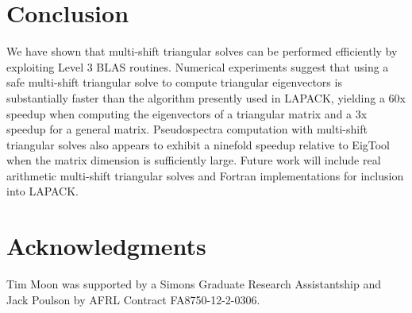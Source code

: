 \documentclass{article}
\begin{document}
\section{Conclusion}
We have shown that multi-shift triangular solves can be performed
efficiently by exploiting Level 3 BLAS routines. Numerical experiments
suggest that using a safe multi-shift triangular solve to compute
triangular eigenvectors is substantially faster than the algorithm
presently used in LAPACK, yielding a 60x speedup when computing the
eigenvectors of a triangular matrix and a 3x speedup for a general
matrix. Pseudospectra computation with multi-shift triangular solves
also appears to exhibit a ninefold speedup relative to EigTool when
the matrix dimension is sufficiently large.  Future work will include
real arithmetic multi-shift triangular solves and Fortran
implementations for inclusion into LAPACK.

\section{Acknowledgments}
Tim Moon was supported by a Simons Graduate Research Assistantship and
Jack Poulson by AFRL Contract FA8750-12-2-0306.

{}

\end{document}
